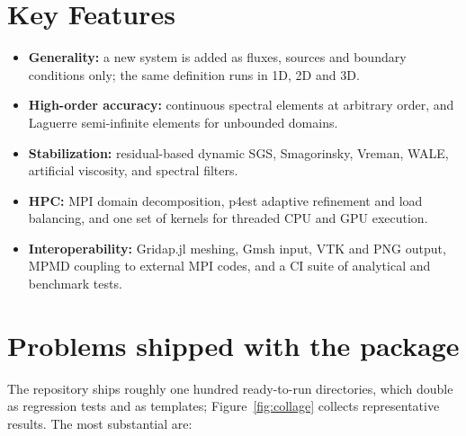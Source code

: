 \documentclass[10pt,onecolumn]{article}
\begin{document}
\section{Key Features}\label{key-features}

\begin{itemize}
\tightlist
\item \textbf{Generality:} a new system is added as fluxes, sources and boundary
  conditions only; the same definition runs in 1D, 2D and 3D.
\item \textbf{High-order accuracy:} continuous spectral elements at arbitrary
  order, and Laguerre semi-infinite elements for unbounded domains.
\item \textbf{Stabilization:} residual-based dynamic SGS, Smagorinsky, Vreman,
  WALE, artificial viscosity, and spectral filters.
\item \textbf{HPC:} MPI domain decomposition, p4est adaptive refinement and load
  balancing, and one set of kernels for threaded CPU and GPU execution.
\item \textbf{Interoperability:} Gridap.jl meshing, Gmsh input, VTK and PNG output, MPMD coupling to external MPI codes, and a CI suite of analytical and benchmark tests.
\end{itemize}

\section{Problems shipped with the package}\label{problems}

The repository ships roughly one hundred ready-to-run directories, which double
as regression tests and as templates; Figure~\ref{fig:collage} collects
representative results. The most substantial are:
\end{document}
